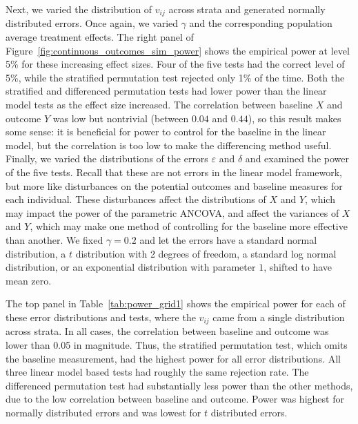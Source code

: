 \documentclass[12pt]{article}
\begin{document}
Next, we varied the distribution of $v_{ij}$ across strata and generated normally distributed errors.
Once again, we varied $\gamma$ and the corresponding population average treatment effects.
The right panel of Figure~\ref{fig:continuous_outcomes_sim_power} shows the empirical power at level 5\% for these increasing effect sizes.
Four of the five tests had the correct level of 5\%, while the stratified permutation test rejected only 1\% of the time.
Both the stratified and differenced permutation tests had lower power than the linear model tests as the effect size increased.
The correlation between baseline $X$ and outcome $Y$ was low but nontrivial (between $0.04$ and $0.44$), so this result makes some sense:
it is beneficial for power to control for the baseline in the linear model, but the correlation is too low to make the differencing method useful.
Finally, we varied the distributions of the errors $\varepsilon$ and $\delta$ and examined the power of the five tests.
Recall that these are not errors in the linear model framework, but more like disturbances on the potential outcomes and baseline measures for each individual.
These disturbances affect the distributions of $X$ and $Y$, which may impact the power of the parametric ANCOVA, and affect the variances of $X$ and $Y$, which may make one method of controlling for the baseline more effective than another.
We fixed $\gamma=0.2$ and let the errors have a standard normal distribution, a $t$ distribution with 2 degrees of freedom, a standard log normal distribution, or an exponential distribution with parameter $1$, shifted to have mean zero.

The top panel in Table~\ref{tab:power_grid1} shows the empirical power for each of these error distributions and tests, where the $v_{ij}$ came from a single distribution across strata.
In all cases, the correlation between baseline and outcome was lower than 0.05 in magnitude.
Thus, the stratified permutation test, which omits the baseline measurement, had the highest power for all error distributions.
All three linear model based tests had roughly the same rejection rate.
The differenced permutation test had substantially less power than the other methods, due to the low correlation between baseline and outcome.
Power was highest for normally distributed errors and was lowest for $t$ distributed errors.
\end{document}
